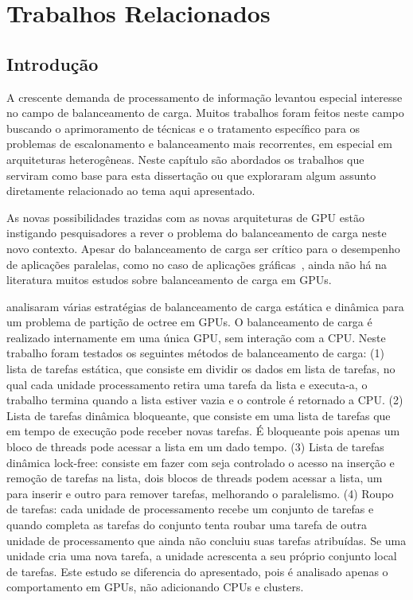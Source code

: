 \pagestyle{empty}
\cleardoublepage
\pagestyle{fancy}
\chapter{Trabalhos Relacionados}\label{cap2}

\section{Introdução}\label{cap2:intro}


A crescente demanda de processamento de informação levantou especial interesse no campo de balanceamento de carga. Muitos trabalhos foram feitos neste campo buscando o aprimoramento de técnicas e o tratamento específico para os problemas de escalonamento e balanceamento mais recorrentes, em especial em arquiteturas heterogêneas. Neste capítulo são abordados os trabalhos que serviram como base para esta dissertação ou que exploraram algum assunto diretamente relacionado ao tema aqui apresentado. 


As novas possibilidades trazidas com as novas arquiteturas de GPU
estão instigando pesquisadores a rever o problema do balanceamento de
carga neste novo contexto. Apesar do balanceamento de carga ser crítico para o desempenho de aplicações paralelas, como no caso de aplicações gráficas~\citep{kdtree, ray}, ainda não há na literatura muitos estudos sobre balanceamento de carga em GPUs.

\citep{graphics} analisaram várias estratégias de balanceamento de carga estática
e dinâmica para um problema de partição de octree em GPUs. O balanceamento de
carga é realizado internamente em uma única GPU, sem interação com a CPU. Neste trabalho foram testados os seguintes métodos de balanceamento de carga: (1) lista de tarefas estática, que consiste em dividir os dados em lista de tarefas, no qual cada unidade processamento retira uma tarefa da lista e executa-a, o trabalho termina quando a lista estiver vazia e o controle é retornado a CPU. (2) Lista de tarefas dinâmica bloqueante, que consiste em uma lista de tarefas que em tempo de execução pode receber novas tarefas. É bloqueante pois apenas um bloco de threads pode acessar a lista em um dado tempo. (3) Lista de tarefas dinâmica lock-free: consiste  
em fazer com seja controlado o acesso na inserção  e remoção de tarefas na lista, dois blocos de threads podem acessar a lista, um para inserir e outro para remover tarefas, melhorando o paralelismo. (4) Roupo de tarefas: cada unidade de processamento recebe um conjunto de tarefas e quando completa as tarefas do conjunto tenta roubar uma tarefa de outra unidade de processamento que ainda não concluiu suas tarefas atribuídas. Se uma unidade cria uma nova tarefa, a unidade acrescenta a seu próprio conjunto local de tarefas. Este estudo se diferencia do apresentado, pois é analisado apenas o comportamento em GPUs, não adicionando CPUs e clusters. 

